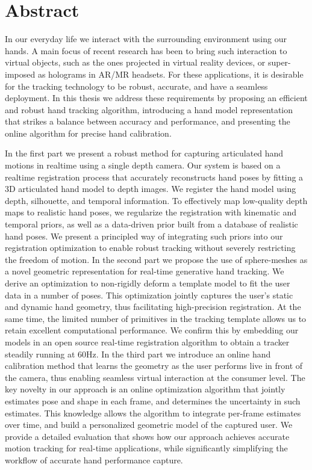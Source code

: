 \vspace{-5em}
\chapter*{Abstract}

In our everyday life we interact with the surrounding environment using our hands. A main focus of recent research has been to bring such interaction to virtual objects, such as the ones projected in virtual reality devices, or super-imposed as holograms in AR/MR headsets. For these applications, it is desirable for the tracking technology to be robust, accurate, and have a seamless deployment. In this thesis we address these requirements by proposing an efficient and robust hand tracking algorithm, introducing a hand model representation that strikes a balance between accuracy and performance, and presenting the online algorithm for precise hand calibration.

\vspace{-0.5em}
In the first part we present a robust method for capturing articulated hand motions in realtime using a single depth camera. Our system is based on a realtime registration process that accurately reconstructs hand poses by fitting a 3D articulated hand model to depth images. We register the hand model using depth, silhouette, and temporal information. To effectively map low-quality depth maps to realistic hand poses, we regularize the registration with kinematic and temporal priors, as well as a data-driven prior built from a database of realistic hand poses. We present a principled way of integrating such priors into our registration optimization to enable robust tracking without severely restricting the freedom of motion. 
%
In the second part we propose the use of sphere-meshes as a novel geometric representation for real-time generative hand tracking.  We derive an optimization to non-rigidly deform a template model to fit the user data in a number of poses. This optimization jointly captures the user's static and dynamic hand geometry, thus facilitating high-precision registration. At the same time, the limited number of primitives in the tracking template allows us to retain excellent computational performance. We confirm this by embedding our models in an open source real-time registration algorithm to obtain a tracker steadily running at 60Hz.
%
In the third part we introduce an online hand calibration method that learns the geometry as the user performs live in front of the camera, thus enabling seamless virtual interaction at the consumer level. The key novelty in our approach is an online optimization algorithm that jointly estimates pose and shape in each frame, and determines the uncertainty in such estimates. This knowledge allows the algorithm to integrate per-frame estimates over time, and build a personalized geometric model of the captured user. We provide a detailed evaluation that shows how our approach achieves accurate motion tracking for real-time applications, while significantly simplifying the workflow of accurate hand performance capture.

